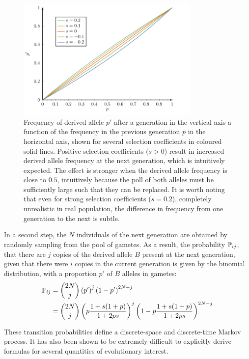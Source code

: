 \begin{figure}[H]
    \centering
    \includegraphics[width=0.8\textwidth, page=1] {figures.pdf}
    \caption[Frequency of derived {allele} after a generation]{
    Frequency of derived allele $p'$ after a generation in the vertical axis a function of the frequency in the previous generation $p$ in the horizontal axis, shown for several selection coefficients in coloured solid lines.
    Positive selection coefficients ($s > 0$) result in increased derived allele frequency at the next generation, which is intuitively expected.
    The effect is stronger when the derived allele frequency is close to $0.5$, intuitively because the poll of both alleles must be sufficiently large such that they can be replaced.
    It is worth noting that even for strong selection coefficients ($s=0.2$), completely unrealistic in real population, the difference in frequency from one generation to the next is subtle.}
    \label{fig:frequency-derived-allele}
\end{figure}


In a second step, the $N$ individuals of the next generation are obtained by randomly sampling from the pool of gametes.
As a result, the probability $\mathbb{P}_{ij}$, that there are $j$ copies of the derived allele $B$ present at the next generation, given that there were $i$ copies in the current generation is given by the binomial distribution, with a proportion $p'$ of $B$ alleles in gametes:
\begin{align}
\mathbb{P}_{ij} & = \binom{2 N}{j} \left( p' \right)^j \left(1 - p' \right)^{2 N -j} \\
& = \binom{2 N}{j} \left( p\dfrac{1+s(1+p)}{1 + 2ps} \right)^j \left(1 - p\dfrac{1+s(1+p)}{1 + 2ps} \right)^{2 N -j} \label{eq:binomial-WF}
\end{align}

These transition probabilities define a discrete-space and discrete-time Markov process.
It has also been shown to be extremely difficult to explicitly derive formulas for several quantities of evolutionary interest.

